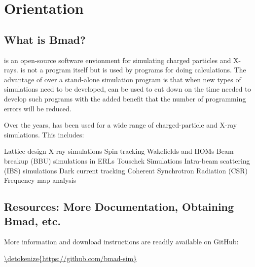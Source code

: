 \chapter{Orientation}
\label{c:orient}

\section{What is Bmad?}

\bmad is an open-source software envionment for simulating charged particles and
X-rays. \bmad is not a program itself but is used by programs for doing calculations. The advantage
of \bmad over a stand-alone simulation program is that when new types of simulations need to be
developed, \bmad can be used to cut down on the time needed to develop such programs with the added
benefit that the number of programming errors will be reduced.

Over the years, \bmad has been used for a wide range of charged-particle and X-ray simulations. This
includes:
\begin{example}
Lattice design                                  X-ray simulations
Spin tracking                                   Wakefields and HOMs
Beam breakup (BBU) simulations in ERLs          Touschek Simulations
Intra-beam scattering (IBS) simulations         Dark current tracking
Coherent Synchrotron Radiation (CSR)            Frequency map analysis
\end{example}

\section{Resources: More Documentation, Obtaining Bmad, etc.}
\label{s:bmad.web}

More information and download instructions are readily available on GitHub:
\begin{example}
  \url{\detokenize{https://github.com/bmad-sim}}
\end{example}
